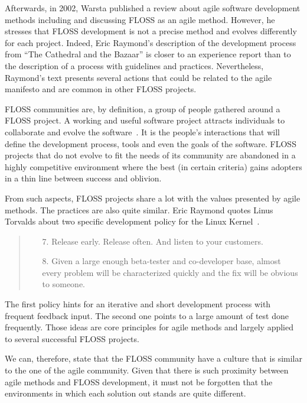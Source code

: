 \documentclass[lnbip]{svmultln}
\begin{document}
Afterwards, in 2002, Warsta \cite{warsta2002} published a review about
agile software development methods including and discussing FLOSS as
an agile method.  However, he stresses that FLOSS development is not a
precise method and evolves differently for each project. Indeed, Eric
Raymond's description of the development process from ``The Cathedral
and the Bazaar'' \cite{raymond1999} is closer to an experience report
than to the description of a process with guidelines and
practices. Nevertheless, Raymond's text presents several actions that
could be related to the agile manifesto \cite{url:agilemanifesto} and
are common in other FLOSS projects.

FLOSS communities are, by definition, a group of people gathered
around a FLOSS project. A working and useful software project attracts
individuals to collaborate and evolve the
software~\cite{crowston2002}. It is the people's interactions that
will define the development process, tools and even the goals of the
software. FLOSS projects that do not evolve to fit the needs of its
community are abandoned in a highly competitive environment where the
best (in certain criteria) gains adopters in a thin line between
success and oblivion.

From such aspects, FLOSS projects share a lot with the values
presented by agile methods. The practices are also quite similar. Eric
Raymond quotes Linus Torvalds about two specific development policy
for the Linux Kernel~\cite{raymond1999}.
\begin{quote}
  \begin{enumerate}
  \item[7.] Release early. Release often. And listen to your
    customers.
  \item[8.] Given a large enough beta-tester and co-developer base,
    almost every problem will be characterized quickly and the fix
    will be obvious to someone.
  \end{enumerate}
\end{quote}

The first policy hints for an iterative and short development process
with frequent feedback input. The second one points to a large amount
of test done frequently. Those ideas are core principles for agile
methods and largely applied to several successful FLOSS projects.

We can, therefore, state that the FLOSS community have a culture that
is similar to the one of the agile community. Given that there is such
proximity between agile methods and FLOSS development, it must not be
forgotten that the environments in which each solution out stands are
quite different.
\end{document}
